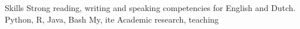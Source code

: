 
\begin{rubric}{Skills}
\entry*[Languages]
	Strong reading, writing and speaking competencies for English and Dutch.
\entry*[Coding]
	Python, R, Java, Bash
\entry*[Databases]
	My, ite
\entry*[Misc.]
	Academic research, teaching
\end{rubric}